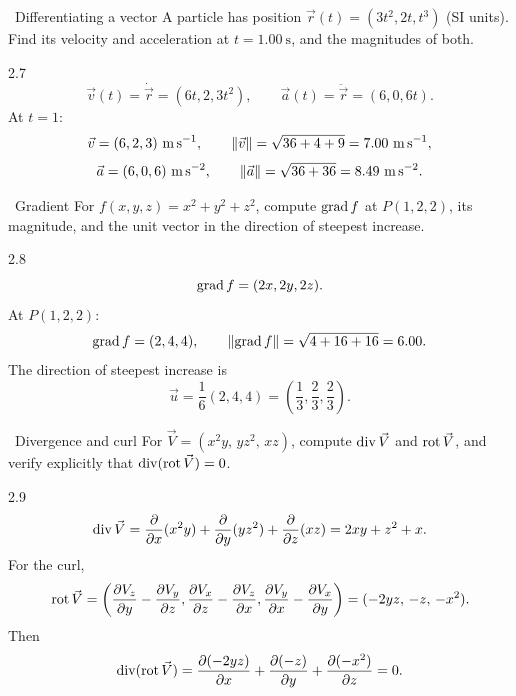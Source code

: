 \begin{exercise}{\core\ Differentiating a vector}
A particle has position $\vec r(t)=(3t^2,2t,t^3)$ (SI units). Find its velocity
and acceleration at $t=1.00\ \mathrm{s}$, and the magnitudes of both.
\end{exercise}

\begin{tabletworkspace}[6.5cm]
\end{tabletworkspace}

\begin{solution}{2.7}
\[
\vec v(t)=\dot{\vec r}=(6t,2,3t^2),\qquad
\vec a(t)=\ddot{\vec r}=(6,0,6t).
\]
At $t=1$:
\[
\vec v=(6,2,3)\ \mathrm{m\,s^{-1}},\qquad
\left\lVert \vec v \right\rVert=\sqrt{36+4+9}=7.00\ \mathrm{m\,s^{-1}},
\]
\[
\vec a=(6,0,6)\ \mathrm{m\,s^{-2}},\qquad
\left\lVert \vec a \right\rVert=\sqrt{36+36}=8.49\ \mathrm{m\,s^{-2}}.
\]
\end{solution}

\begin{exercise}{\core\ Gradient}
For $f(x,y,z)=x^2+y^2+z^2$, compute $\operatorname{grad} f$ at $P(1,2,2)$, its magnitude, and
the unit vector in the direction of steepest increase.
\end{exercise}

\begin{tabletworkspace}[6.5cm]
\end{tabletworkspace}

\begin{solution}{2.8}
\[
\operatorname{grad} f=(2x,2y,2z).
\]
At $P(1,2,2)$:
\[
\operatorname{grad} f=(2,4,4),\qquad \left\lVert \operatorname{grad} f \right\rVert=\sqrt{4+16+16}=6.00.
\]
The direction of steepest increase is
\[
\vec u=\frac{1}{6}(2,4,4)=\left(\frac13,\frac23,\frac23\right).
\]
\end{solution}

\begin{exercise}{\mastery\ Divergence and curl}
For $\vec V=(x^2y,\,yz^2,\,xz)$, compute $\operatorname{div}\vec V$ and $\operatorname{rot}\vec V$, and
verify explicitly that $\operatorname{div}(\operatorname{rot}\vec V)=0$.
\end{exercise}

\begin{tabletworkspace}[6.5cm]
\end{tabletworkspace}

\begin{solution}{2.9}
\[
\operatorname{div}\vec V=\frac{\partial}{\partial x}(x^2y)
+\frac{\partial}{\partial y}(yz^2)
+\frac{\partial}{\partial z}(xz)
=2xy+z^2+x.
\]
For the curl,
\[
\operatorname{rot}\vec V=
\left(
\frac{\partial V_z}{\partial y}-\frac{\partial V_y}{\partial z},
\frac{\partial V_x}{\partial z}-\frac{\partial V_z}{\partial x},
\frac{\partial V_y}{\partial x}-\frac{\partial V_x}{\partial y}
\right)
=(-2yz,\,-z,\,-x^2).
\]
Then
\[
\operatorname{div}(\operatorname{rot}\vec V)
=\frac{\partial(-2yz)}{\partial x}
+\frac{\partial(-z)}{\partial y}
+\frac{\partial(-x^2)}{\partial z}
=0.
\]
\end{solution}

